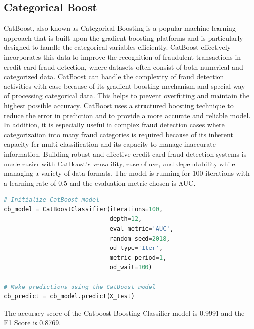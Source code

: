  \subsection{Categorical Boost}

 CatBoost, also known as Categorical Boosting is a popular machine learning approach that is built upon the gradient boosting platforms and is particularly designed to handle the categorical variables efficiently. CatBoost effectively incorporates this data to improve the recognition of fraudulent transactions in credit card fraud detection, where datasets often consist of both numerical and categorized data. CatBoost can handle the complexity of fraud detection activities with ease because of its gradient-boosting mechanism and special way of processing categorical data. This helps to prevent overfitting and maintain the highest possible accuracy. CatBoost uses a structured boosting technique to reduce the error in prediction and to provide a more accurate and reliable model. In addition, it is especially useful in complex fraud detection cases where categorization into many fraud categories is required because of its inherent capacity for multi-classification and its capacity to manage inaccurate information. Building robust and effective credit card fraud detection systems is made easier with CatBoost's versatility, ease of use, and dependability while managing a variety of data formats. The model is running for 100 iterations with a learning rate of 0.5 and the evaluation metric chosen is AUC.

 \begin{lstlisting}[language=Python, caption={Creating and training Catboost model}, label=list:python_code_ex]
# Initialize CatBoost model
cb_model = CatBoostClassifier(iterations=100,
                              depth=12,
                              eval_metric='AUC',
                              random_seed=2018,
                              od_type='Iter',
                              metric_period=1,
                              od_wait=100)

# Make predictions using the CatBoost model
cb_predict = cb_model.predict(X_test)
\end{lstlisting}
\clearpage

 The accuracy score of the Catboost Boosting Classifier model is 0.9991 and the F1 Score is 0.8769.  

